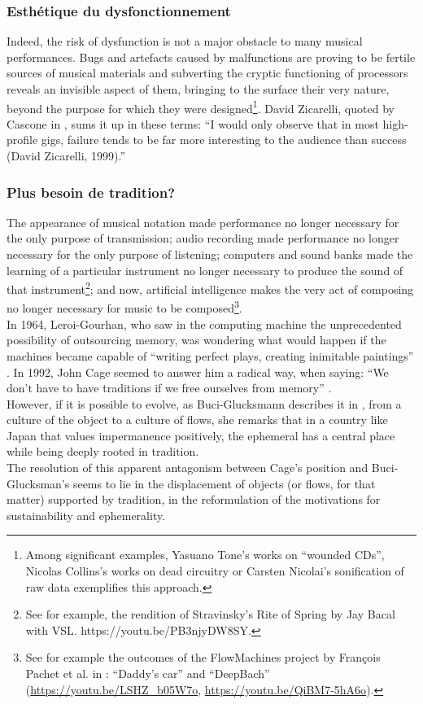 \subsubsection{Esthétique du dysfonctionnement}
Indeed, the risk of dysfunction is not a major obstacle to many musical performances. Bugs and artefacts caused by malfunctions are proving to be fertile sources of musical materials and subverting the cryptic functioning of processors reveals an invisible aspect of them, bringing to the surface their very nature, beyond the purpose for which they were designed\footnote{Among significant examples, Yasuano Tone's works on “wounded CDs”, Nicolas Collins's works on dead circuitry or Carsten Nicolai's sonification of raw data exemplifies this approach.}. David Zicarelli, quoted by Cascone in \cite{cascone_aesthetics_2000}, sums it up in these terms: “I would only observe that in most high-profile gigs, failure tends to be far more interesting to the audience than success (David Zicarelli, 1999).”

\subsubsection{Plus besoin de tradition?}
The appearance of musical notation made performance no longer necessary for the only purpose of transmission; audio recording made performance no longer necessary for the only purpose of listening; computers and sound banks made the learning of a particular instrument no longer necessary to produce the sound of that instrument\footnote{See for example, the rendition of Stravinsky's Rite of Spring by Jay Bacal with VSL. https://youtu.be/PB3njyDW8SY.}; and now, artificial intelligence makes the very act of composing no longer necessary for music to be composed\footnote{See for example the outcomes of the FlowMachines project by François Pachet et al. in \cite{hadjeres_deepbach:_2016}: “Daddy's car” and “DeepBach” (\url{https://youtu.be/LSHZ_b05W7o}, \url{https://youtu.be/QiBM7-5hA6o}).}.\\
\indent In 1964, Leroi-Gourhan, who saw in the computing machine the unprecedented possibility of outsourcing memory, was wondering what would happen if the machines became capable of “writing perfect plays, creating inimitable paintings” \cite{gourhan_geste_1964}. In 1992, John Cage seemed to answer him a radical way, when saying: “We don't have to have traditions if we free ourselves from memory” \cite{sebestik_ecoute_1992}. \\
\indent However, if it is possible to evolve, as Buci-Glucksmann describes it in \cite{buci-glucksmann_esthetique_2003}, from a culture of the object to a culture of flows, she remarks that in a country like Japan that values impermanence positively, the ephemeral has a central place while being deeply rooted in tradition.	\\
\indent The resolution of this apparent antagonism between Cage's position and Buci-Glucksman's seems to lie in the displacement of objects (or flows, for that matter) supported by tradition, in the reformulation of the motivations for sustainability and ephemerality.


